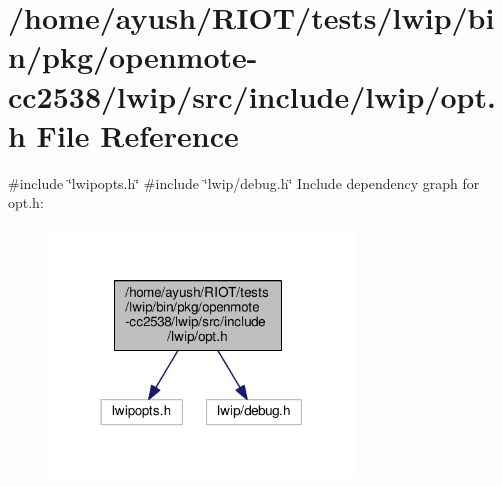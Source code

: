 \hypertarget{openmote-cc2538_2lwip_2src_2include_2lwip_2opt_8h}{}\section{/home/ayush/\+R\+I\+O\+T/tests/lwip/bin/pkg/openmote-\/cc2538/lwip/src/include/lwip/opt.h File Reference}
\label{openmote-cc2538_2lwip_2src_2include_2lwip_2opt_8h}
{\ttfamily \#include \char`\"{}lwipopts.\+h\char`\"{}}\newline
{\ttfamily \#include \char`\"{}lwip/debug.\+h\char`\"{}}\newline
Include dependency graph for opt.\+h\+:
\nopagebreak
\begin{figure}[H]
\begin{center}
\leavevmode
\includegraphics[width=230pt]{openmote-cc2538_2lwip_2src_2include_2lwip_2opt_8h__incl}
\end{center}
\end{figure}
